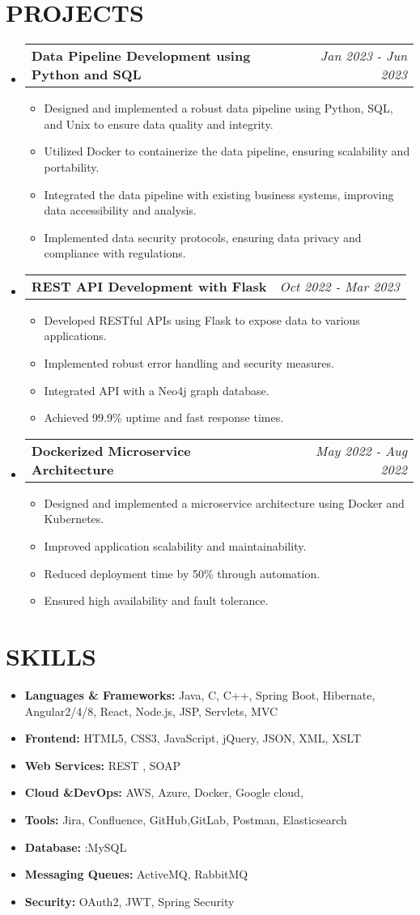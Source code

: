 \documentclass[letterpaper,11pt]{article}
\makeatletter
\newcommand{\resumeItem}[1]{\item\small{{#1 \vspace{-3pt}}}}
\newcommand{\resumeProjectHeading}[2]{\item\begin{tabular*}{0.97\textwidth}{l@{\extracolsep{\fill}}r}\small#1 & #2 \\ \end{tabular*}\vspace{-7pt}}
\newcommand{\resumeSubHeadingListStart}{\begin{itemize}[leftmargin=0.15in, label={}]}
\newcommand{\resumeSubHeadingListEnd}{\end{itemize}}
\newcommand{\resumeItemListStart}{\begin{itemize}}
\newcommand{\resumeItemListEnd}{\end{itemize}\vspace{-5pt}}
\makeatother
\begin{document}
\section{{\fontsize{9pt}{20pt}\selectfont \textbf{PROJECTS}}}\resumeSubHeadingListStart
\resumeProjectHeading{\textbf{Data Pipeline Development using Python and SQL}}{\textit{Jan 2023 - Jun 2023}}
\resumeItemListStart
\resumeItem{Designed and implemented a robust data pipeline using Python, SQL, and Unix to ensure data quality and integrity.}
\resumeItem{Utilized Docker to containerize the data pipeline, ensuring scalability and portability.}
\resumeItem{Integrated the data pipeline with existing business systems, improving data accessibility and analysis.}
\resumeItem{Implemented data security protocols, ensuring data privacy and compliance with regulations.}
\resumeItemListEnd\vspace{-6pt}
\resumeProjectHeading{\textbf{REST API Development with Flask}}{\textit{Oct 2022 - Mar 2023}}
\resumeItemListStart
\resumeItem{Developed RESTful APIs using Flask to expose data to various applications.}
\resumeItem{Implemented robust error handling and security measures.}
\resumeItem{Integrated API with a Neo4j graph database.}
\resumeItem{Achieved 99.9\% uptime and fast response times.}
\resumeItemListEnd\vspace{-6pt}
\resumeProjectHeading{\textbf{Dockerized Microservice Architecture}}{\textit{May 2022 - Aug 2022}}
\resumeItemListStart
\resumeItem{Designed and implemented a microservice architecture using Docker and Kubernetes.}
\resumeItem{Improved application scalability and maintainability.}
\resumeItem{Reduced deployment time by 50\% through automation.}
\resumeItem{Ensured high availability and fault tolerance.}
\resumeItemListEnd
\resumeSubHeadingListEnd\vspace{-17pt}
\section{{\fontsize{9pt}{20pt}\selectfont \textbf{SKILLS}}}\resumeSubHeadingListStart
\resumeItem{\textbf{Languages \& Frameworks:} Java, C, C++, Spring Boot, Hibernate, Angular2/4/8, React, Node.js, JSP, Servlets, MVC}\vspace{-7pt}
\resumeItem{\textbf{Frontend:} HTML5, CSS3, JavaScript, jQuery, JSON, XML, XSLT}\vspace{-7pt}
\resumeItem{\textbf{Web Services:} REST , SOAP}\vspace{-7pt}
\resumeItem{\textbf{Cloud \&DevOps:} AWS, Azure, Docker, Google cloud,}\vspace{-7pt}
\resumeItem{\textbf{Tools:} Jira, Confluence, GitHub,GitLab, Postman, Elasticsearch}\vspace{-7pt}
\resumeItem{\textbf{Database:} :MySQL}\vspace{-7pt}
\resumeItem{\textbf{Messaging Queues:} ActiveMQ, RabbitMQ}\vspace{-7pt}
\resumeItem{\textbf{Security:} OAuth2, JWT, Spring Security}
\resumeSubHeadingListEnd\vspace{-10pt}
\end{document}
